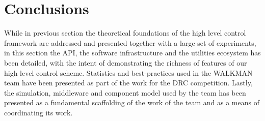 \section{Conclusions}
While in previous section the theoretical foundations of the high level control framework are addressed and presented together with a large set of experiments, in this section the API, the software infrastructure and the utilities ecosystem has been detailed, with the intent of demonstrating the richness of features of our high level control scheme.
Statistics and best-practices used in the WALKMAN team have been presented as part of the work for the DRC competition. Lastly, the simulation, middleware and component model used by the team has been presented as a fundamental scaffolding of the work of the team and as a means of coordinating its work.
